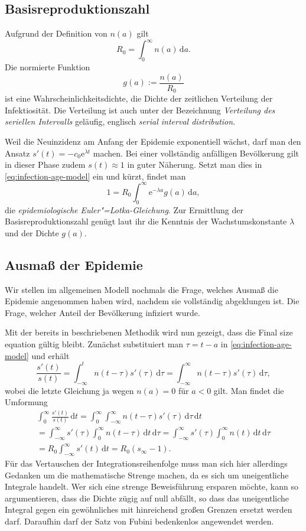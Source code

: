 \documentclass[a4paper,10pt,fleqn,twocolumn,twoside,dvipdfmx]{scrartcl}
\numberwithin{equation}{section}
\newcommand{\ee}{\mathrm e}
\begin{document}
\subsection{Basisreproduktionszahl}

Aufgrund der Definition von $n(a)$ gilt
\[R_0 = \int_0^\infty n(a)\,\mathrm da.\]
Die normierte Funktion
\[g(a) := \frac{n(a)}{R_0}\]
ist eine Wahrscheinlichkeitsdichte, die Dichte der zeitlichen Verteilung
der Infektiosität. Die Verteilung ist auch unter der Bezeichnung
\emph{Verteilung des seriellen Intervalls} geläufig, englisch
\emph{serial interval distribution}.

Weil die Neuinzidenz am Anfang der Epidemie exponentiell wächst,
darf man den Ansatz $s'(t)=-c_0\ee^{\lambda t}$ machen. Bei einer
vollständig anfälligen Bevölkerung gilt in dieser Phase zudem
$s(t)\approx 1$ in guter Näherung. Setzt man dies in
\eqref{eq:infection-age-model} ein und kürzt, findet man
\[1 = R_0\int_0^\infty \ee^{-\lambda a}g(a)\,\mathrm da,\]
die \emph{epidemiologische Euler"=Lotka-Gleichung}. Zur Ermittlung
der Basisreproduktionszahl genügt laut ihr die Kenntnis der
Wachstumskonstante $\lambda$ und der Dichte $g(a)$.

\subsection{Ausmaß der Epidemie}

Wir stellen im allgemeinen Modell nochmals die Frage, welches
Ausmaß die Epidemie angenommen haben wird, nachdem sie vollständig
abgeklungen ist. Die Frage, welcher Anteil der Bevölkerung
infiziert wurde.

Mit der bereits in \cite{Kermack} beschriebenen Methodik wird nun gezeigt,
dass die Final size equation gültig bleibt. Zunächst substituiert man
$\tau=t-a$ in \eqref{eq:infection-age-model} und erhält
\[\frac{s'(t)}{s(t)} = \int_{-\infty}^t n(t-\tau)s'(\tau)\,\mathrm d\tau
= \int_{-\infty}^\infty n(t-\tau)s'(\tau)\,\mathrm d\tau,\]
wobei die letzte Gleichung ja wegen $n(a)=0$ für $a<0$ gilt.
Man findet die Umformung%
\begin{gather*}
\int_0^\infty \frac{s'(t)}{s(t)}\,\mathrm dt
= \int_0^\infty\!\!\int_{-\infty}^\infty n(t-\tau)s'(\tau)\,\mathrm d\tau\,\mathrm dt\\
= \int_{-\infty}^\infty\!\! s'(\tau)\!\int_0^\infty \!\!\! n(t-\tau)\,\mathrm dt\,\mathrm d\tau
= \int_{-\infty}^\infty\!\! s'(\tau)\!\int_0^\infty \!\!\! n(t)\,\mathrm dt\,\mathrm d\tau\\
= R_0 \int_{-\infty}^\infty s'(t)\,\mathrm dt = R_0(s_\infty - 1).
\end{gather*}
Für das Vertauschen der Integrationsreihenfolge muss man sich hier
allerdings Gedanken um die mathematische Strenge machen, da es sich
um uneigentliche Integrale handelt. Wer sich eine strenge
Beweisführung ersparen möchte, kann so argumentieren, dass
die Dichte zügig auf null abfällt, so dass das uneigentliche Integral
gegen ein gewöhnliches mit hinreichend großen Grenzen ersetzt werden
darf. Daraufhin darf der Satz von Fubini bedenkenlos angewendet werden.
\end{document}
